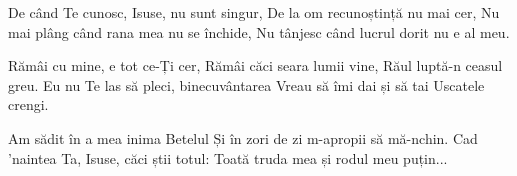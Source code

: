 
\beginverse
De când Te cunosc, Isuse, nu sunt singur,
De la om recunoștință nu mai cer,
Nu mai plâng când rana mea nu se închide,
Nu tânjesc când lucrul dorit nu e al meu.
\endverse

\beginchorus
Rămâi cu mine, e tot ce-Ți cer,
Rămâi căci seara lumii vine,
Răul luptă-n ceasul greu.
Eu nu Te las să pleci, binecuvântarea
Vreau să îmi dai și să tai
Uscatele crengi.
\endchorus

\beginverse
Am sădit în a mea inima Betelul
Și în zori de zi m-apropii să mă-nchin.
Cad ’naintea Ta, Isuse, căci știi totul:
Toată truda mea și rodul meu puțin...
\endverse

\endsong